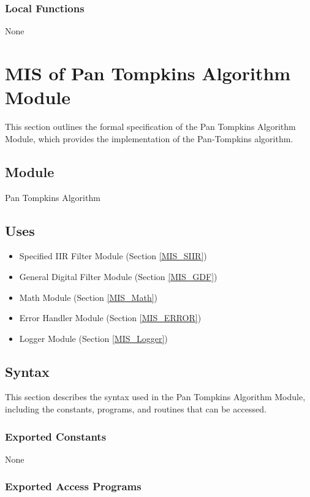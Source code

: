\documentclass[12pt, titlepage]{article}
\begin{document}
\subsubsection{Local Functions}

None

\newpage

\section{MIS of Pan Tompkins Algorithm Module} \label{MIS_Alg}

This section outlines the formal specification of the Pan Tompkins Algorithm
Module, which provides the implementation of the Pan-Tompkins algorithm.

\subsection{Module}

Pan Tompkins Algorithm

\subsection{Uses}

\begin{itemize}
\item Specified IIR Filter Module (Section \ref{MIS_SIIR})
\item General Digital Filter Module (Section \ref{MIS_GDF})
\item Math Module (Section \ref{MIS_Math})
\item Error Handler Module (Section \ref{MIS_ERROR})
\item Logger Module (Section \ref{MIS_Logger})
\end{itemize}

\subsection{Syntax}

This section describes the syntax used in the Pan Tompkins Algorithm Module,
including the constants, programs, and routines that can be accessed.

\subsubsection{Exported Constants}

None

\subsubsection{Exported Access Programs}
\end{document}

